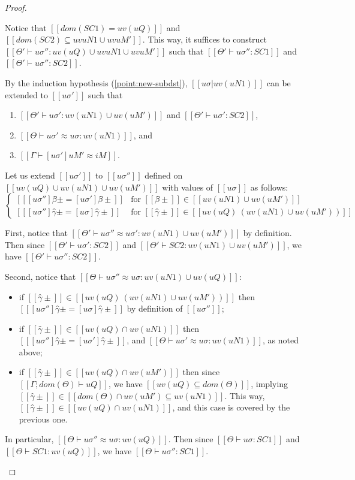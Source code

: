 \begin{proof}
\begin{caseof}
            Notice that $[[dom(SC1) = uv(uQ)]]$ and
            $[[dom(SC2) ⊆ uv uN1 ∪ uv uM']]$.
            This way, it suffices to construct 
            $[[Θ' ⊢ uσ'' : uv(uQ) ∪ uv uN1 ∪ uv uM']]$ such that
            $[[Θ' ⊢ uσ'' : SC1]]$ and $[[Θ' ⊢ uσ'' : SC2]]$.

            By the induction hypothesis (\ref{point:new-subdst}),
            $[[uσ|uv(uN1)]]$
            can be extended to $[[uσ']]$ such that
            \begin{enumerate}
                \item $[[Θ' ⊢ uσ' : uv(uN1) ∪ uv(uM')]]$ and $[[Θ' ⊢ uσ' : SC2]]$,
                \item $[[Θ ⊢ uσ' ≈ uσ: uv(uN1)]]$, and 
                \item $[[Γ ⊢ [uσ']uM' ≈ iM]]$.
            \end{enumerate}
            Let us extend $[[uσ']]$ to $[[uσ'']]$
            defined on $[[uv(uQ) ∪ uv(uN1) ∪ uv(uM')]]$
            with values of $[[uσ]]$ as follows:
            $$
            \begin{cases}
                [[ [uσ'']β̂± = [uσ']β̂± ]] & \text{for $[[β̂±]] \in [[uv(uN1) ∪ uv(uM')]]$}\\
                [[ [uσ'']γ̂± = [uσ]γ̂± ]] & \text{for $[[γ̂±]] \in [[uv(uQ) \ (uv(uN1) ∪ uv(uM'))]]$}
            \end{cases}
            $$

            First, notice that $[[Θ' ⊢ uσ'' ≈ uσ' : uv(uN1) ∪ uv(uM')]]$
            by definition.
            Then since $[[Θ' ⊢ uσ' : SC2]]$ and
            $[[Θ' ⊢ SC2 : uv(uN1) ∪ uv(uM')]]$, 
            we have $[[Θ' ⊢ uσ'' : SC2]]$.

            Second, notice that $[[Θ ⊢ uσ'' ≈ uσ : uv(uN1) ∪ uv(uQ)]]$:
            \begin{itemize}
                \item if $[[γ̂±]] \in [[uv(uQ) \ (uv(uN1) ∪ uv(uM'))]]$
                    then $[[ [uσ'']γ̂± = [uσ]γ̂± ]]$ by definition of $[[uσ'']]$;
                \item if $[[γ̂±]] \in [[uv(uQ) ∩ uv(uN1)]]$
                    then $[[ [uσ'']γ̂± = [uσ']γ̂± ]]$,
                    and $[[Θ ⊢ uσ' ≈ uσ: uv(uN1)]]$, as noted above;
                \item if $[[γ̂±]] \in [[uv(uQ) ∩ uv(uM')]]$
                    then since $[[Γ; dom(Θ) ⊢  uQ]]$, 
                    we have $[[uv(uQ) ⊆ dom(Θ)]]$,
                    implying 
                    $[[γ̂±]] \in [[dom(Θ) ∩ uv(uM') ⊆ uv(uN1)]]$.
                    This way, $[[γ̂±]] \in [[uv(uQ) ∩ uv(uN1)]]$, 
                    and this case is covered by the previous one.
            \end{itemize}
            In particular, $[[Θ ⊢ uσ'' ≈ uσ : uv(uQ)]]$.
            Then since $[[Θ ⊢ uσ : SC1]]$ and $[[Θ ⊢ SC1 : uv(uQ)]]$,
            we have $[[Θ ⊢ uσ'' : SC1]]$.


\end{caseof}
\end{proof}
